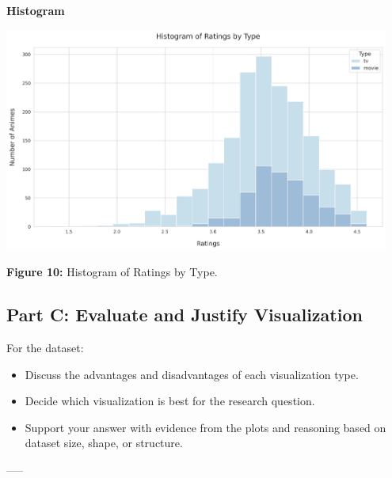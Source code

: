 \textbf{Histogram}
\begin{center}
  \includegraphics[width=0.95\textwidth]{figures/ratings_by_type_histogram_plot.png}
  
  \textbf{Figure 10:} Histogram of Ratings by Type.
\end{center}
\newpage

\subsection{Part C: Evaluate and Justify Visualization}
For the dataset:
\begin{itemize}
    \item Discuss the advantages and disadvantages of each visualization type.
    \item Decide which visualization is best for the research question.
    \item Support your answer with evidence from the plots and reasoning based on dataset size, shape, or structure.
\end{itemize}
-----\\

